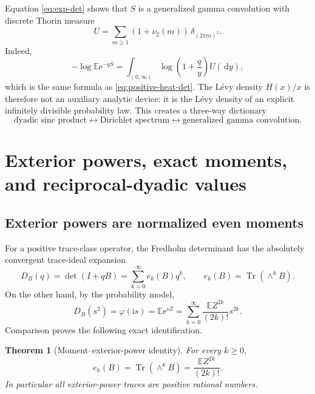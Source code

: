 \documentclass[11pt,oneside]{article}
\newtheorem{theorem}{Theorem}[section]
\theoremstyle{definition}
\newcommand{\dd}{\,\mathrm d}
\newcommand{\e}{\mathrm e}
\newcommand{\ii}{\mathrm i}
\newcommand{\E}{\mathbb E}
\newcommand{\Tr}{\operatorname{Tr}}
\newcommand{\vtwo}{\nu_2}
\newcommand{\phiF}{\varphi}
\begin{document}
Equation \eqref{eq:exp-det} shows that \(S\) is a generalized gamma convolution with
discrete Thorin measure
\begin{equation}
 U=\sum_{m\ge1}(1+\vtwo(m))\,\delta_{(2\pi m)^2}.
 \label{eq:Thorin}
\end{equation}
Indeed,
\begin{equation}
 -\log\E\e^{-qS}
 =\int_{(0,\infty)}\log\!\left(1+\frac qy\right)U(\dd y),
 \label{eq:Thorin-log}
\end{equation}
which is the same formula as \eqref{eq:positive-heat-det}.  The L\'evy density
\(H(x)/x\) is therefore not an auxiliary analytic device: it is the L\'evy density of
an explicit infinitely divisible probability law.  This creates a three-way dictionary
\[
 \text{dyadic sinc product}
 \longleftrightarrow
 \text{Dirichlet spectrum}
 \longleftrightarrow
 \text{generalized gamma convolution}.
\]

\section{Exterior powers, exact moments, and reciprocal-dyadic values}
\label{sec:exterior-dyadic}

\subsection{Exterior powers are normalized even moments}

For a positive trace-class operator, the Fredholm determinant has the absolutely
convergent trace-ideal expansion~\cite{SimonTrace,GohbergKrein}
\begin{equation}
 D_B(q)=\det(I+qB)=\sum_{k=0}^{\infty}e_k(B)q^k,
 \qquad
 e_k(B)=\Tr(\wedge^kB).
 \label{eq:det-exterior-expansion}
\end{equation}
On the other hand, by the probability model,
\begin{equation}
 D_B(s^2)=\phiF(\ii s)=\E\e^{sZ}
 =\sum_{k=0}^{\infty}\frac{\E Z^{2k}}{(2k)!}s^{2k}.
 \label{eq:mgf-exterior}
\end{equation}
Comparison proves the following exact identification.

\begin{theorem}[Moment--exterior-power identity]
\label{thm:moment-exterior}
For every \(k\ge0\),
\begin{equation}
 \boxed{\quad
 e_k(B)=\Tr(\wedge^kB)=\frac{\E Z^{2k}}{(2k)!}.
 \quad}
 \label{eq:moment-exterior}
\end{equation}
In particular all exterior-power traces are positive rational numbers.
\end{theorem}
\end{document}
